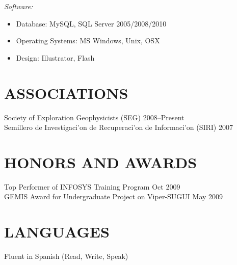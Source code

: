 \documentclass[line,margin]{res}
\begin{document}
\begin{resume}
    {\sl Software:}
    \begin{itemize} \itemsep -2pt
        \item Database: MySQL, SQL Server 2005/2008/2010
        \item Operating Systems: MS Windows, Unix, OSX
        \item Design: Illustrator, Flash
    \end{itemize} 

\section{ASSOCIATIONS} %
\label{sec:associations}
    Society of Exploration Geophysicists (SEG) \hfill 2008--Present\\
    Semillero de Investigaci\a'on de Recuperaci\a'on de Informaci\a'on (SIRI) \hfill 2007\\

\section{HONORS AND AWARDS} %
\label{sec:honors_and_awards}
    Top Performer of INFOSYS Training Program \hfill Oct 2009\\
    GEMIS Award for Undergraduate Project on Viper-SUGUI \hfill May 2009\\

\section{LANGUAGES} %
\label{sec:languages}
    Fluent in Spanish (Read, Write, Speak)

\end{resume}
\end{document}
